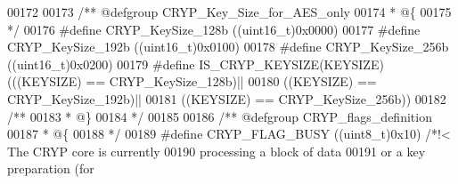 \begin{DoxyCode}
00172 
00173 \textcolor{comment}{/** @defgroup CRYP\_Key\_Size\_for\_AES\_only }
00174 \textcolor{comment}{  * @\{}
00175 \textcolor{comment}{  */}
00176 \textcolor{preprocessor}{#}\textcolor{preprocessor}{define} \textcolor{preprocessor}{CRYP\_KeySize\_128b}         \textcolor{preprocessor}{(}\textcolor{preprocessor}{(}\textcolor{preprocessor}{uint16\_t}\textcolor{preprocessor}{)}0x0000\textcolor{preprocessor}{)}
00177 \textcolor{preprocessor}{#}\textcolor{preprocessor}{define} \textcolor{preprocessor}{CRYP\_KeySize\_192b}         \textcolor{preprocessor}{(}\textcolor{preprocessor}{(}\textcolor{preprocessor}{uint16\_t}\textcolor{preprocessor}{)}0x0100\textcolor{preprocessor}{)}
00178 \textcolor{preprocessor}{#}\textcolor{preprocessor}{define} \textcolor{preprocessor}{CRYP\_KeySize\_256b}         \textcolor{preprocessor}{(}\textcolor{preprocessor}{(}\textcolor{preprocessor}{uint16\_t}\textcolor{preprocessor}{)}0x0200\textcolor{preprocessor}{)}
00179 \textcolor{preprocessor}{#}\textcolor{preprocessor}{define} \textcolor{preprocessor}{IS\_CRYP\_KEYSIZE}\textcolor{preprocessor}{(}\textcolor{preprocessor}{KEYSIZE}\textcolor{preprocessor}{)} \textcolor{preprocessor}{(}\textcolor{preprocessor}{(}\textcolor{preprocessor}{(}\textcolor{preprocessor}{KEYSIZE}\textcolor{preprocessor}{)} \textcolor{preprocessor}{==} CRYP_KeySize_128b\textcolor{preprocessor}{)}\textcolor{preprocessor}{||}
00180                                   \textcolor{preprocessor}{(}\textcolor{preprocessor}{(}\textcolor{preprocessor}{KEYSIZE}\textcolor{preprocessor}{)} \textcolor{preprocessor}{==} CRYP_KeySize_192b\textcolor{preprocessor}{)}\textcolor{preprocessor}{||}
00181                                   \textcolor{preprocessor}{(}\textcolor{preprocessor}{(}\textcolor{preprocessor}{KEYSIZE}\textcolor{preprocessor}{)} \textcolor{preprocessor}{==} CRYP_KeySize_256b\textcolor{preprocessor}{)}\textcolor{preprocessor}{)}
00182 \textcolor{comment}{/**}
00183 \textcolor{comment}{  * @\}}
00184 \textcolor{comment}{  */}
00185 
00186 \textcolor{comment}{/** @defgroup CRYP\_flags\_definition }
00187 \textcolor{comment}{  * @\{}
00188 \textcolor{comment}{  */}
00189 \textcolor{preprocessor}{#}\textcolor{preprocessor}{define} \textcolor{preprocessor}{CRYP\_FLAG\_BUSY}            \textcolor{preprocessor}{(}\textcolor{preprocessor}{(}\textcolor{preprocessor}{uint8\_t}\textcolor{preprocessor}{)}0x10\textcolor{preprocessor}{)}  \textcolor{comment}{/*!< The CRYP core is currently }
00190 \textcolor{comment}{                                                        processing a block of data }
00191 \textcolor{comment}{                                                        or a key preparation (for }

\end{DoxyCode}
